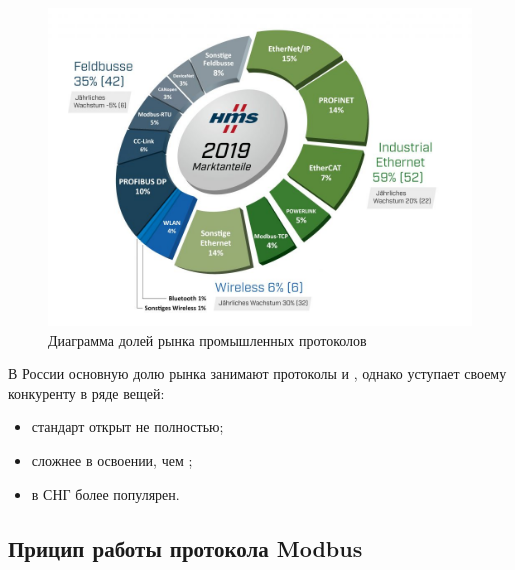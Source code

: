 \documentclass[../AISTR.tex]{subfiles}
\begin{document}
\begin{figure}[h]
	\centering
	\includegraphics[width=0.8\linewidth]{../images/divide}
	\caption{Диаграмма долей рынка промышленных протоколов}
	\label{fig:divide}
\end{figure}

В России основную долю рынка занимают протоколы \mb и \pb \cite{__2010}, однако \pb уступает своему конкуренту в ряде вещей:
\begin{itemize}
	\item стандарт открыт не полностью;
	\item сложнее в освоении, чем \mb;
	\item в СНГ \mb более популярен.
\end{itemize}

\subsection{Прицип работы протокола Modbus}
\end{document}
